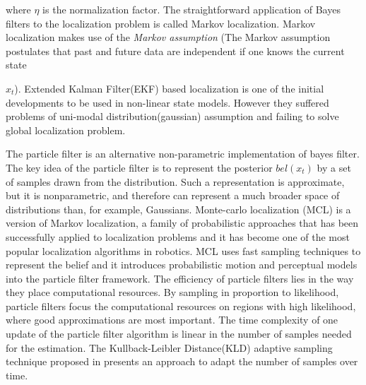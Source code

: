 where $\eta$ is the normalization factor. The straightforward application of Bayes filters to the localization problem is called Markov localization. Markov localization makes use of the \emph{Markov assumption} (The Markov assumption postulates that past and future data are independent if one knows the current state {$x_t$). Extended Kalman Filter(EKF) based localization is one of the initial developments to be used in non-linear state models. However they suffered problems of uni-modal distribution(gaussian) assumption and failing to solve global localization problem. 

The particle filter \cite{thrun2005probabilistic} is an alternative non-parametric implementation of bayes filter. The key idea of the particle filter is to represent the posterior $bel(x_t)$ by a set of samples drawn from the distribution. Such a representation is approximate, but it is nonparametric, and therefore can represent a much broader space of distributions than, for example, Gaussians. 
Monte-carlo localization (MCL) \cite{fox1999monte} is a version of Markov localization, a family of probabilistic approaches that has been successfully applied to localization problems and it has become one of the most popular localization algorithms in robotics. MCL uses fast sampling techniques to represent the belief and it introduces probabilistic motion and perceptual models into the particle filter framework. The efficiency of particle filters lies in the way they place computational resources. By sampling in proportion to likelihood, particle filters focus the computational resources on regions with high likelihood, where good approximations are most important. The time complexity of one update of the particle filter algorithm is linear in the number of samples needed for the estimation. The Kullback-Leibler Distance(KLD) adaptive sampling technique proposed in \cite{fox2003adapting} presents an approach to adapt the number of samples over time. 

}
